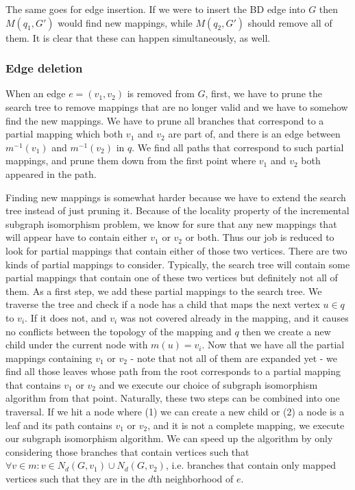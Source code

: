The same goes for edge insertion. If we were to insert the BD edge into $G$ then
$M(q_1, G')$ would find new mappings, while $M(q_2, G')$ should remove all of them.
It is clear that these can happen simultaneously, as well.

\subsubsection{Edge deletion}

When an edge $e = (v_1, v_2)$ is removed from $G$, first, we have to prune the search
tree to remove mappings that are no longer valid and we have to somehow find the new 
mappings. We have to prune all branches that correspond to a partial mapping which both
$v_1$ and $v_2$ are part of, and there is an edge between $m^{-1}(v_1)$ and $m^{-1}(v_2)$ 
in $q$. We find all paths that correspond to such partial mappings, and prune them down
from the first point where $v_1$ and $v_2$ both appeared in the path.


Finding new mappings is somewhat harder because we have to extend the search tree instead
of just pruning it. Because of the locality property of the incremental subgraph isomorphism
problem, we know for sure that any new mappings that will appear have to contain either $v_1$
or $v_2$ or both. Thus our job is reduced to look for partial mappings that contain either of 
those two vertices. There are two kinds of partial mappings to consider. Typically, the search
tree will contain some partial mappings that contain one of these two vertices but definitely
not all of them. As a first step, we add these partial mappings to the search tree. We traverse 
the tree and check if a node has a child that maps the next vertex $u \in q$ to $v_i$. If it does
not, and $v_i$ was not covered already in the mapping, and it causes no conflicts between the 
topology of the mapping and $q$ then we create a new child under the current node with 
$m(u) = v_i$. Now that we have all the partial mappings containing $v_1$ or $v_2$ - note that not 
all of them are expanded yet - we find all those leaves whose path from the root corresponds to a 
partial mapping that contains $v_1$ or $v_2$ and we execute our choice of subgraph isomorphism 
algorithm from that point. Naturally, these two steps can be combined into one traversal. If we 
hit a node where (1) we can create a new child or (2) a node is a leaf and its path contains $v_1$ 
or $v_2$, and it is not a complete mapping, we execute our subgraph isomorphism algorithm. We
can speed up the algorithm by only considering those branches that contain vertices such that
$\forall v \in m: v \in N_d(G, v_1) \cup N_d(G, v_2)$, i.e. branches that contain only mapped 
vertices such that they are in the $d$th neighborhood of $e$.

